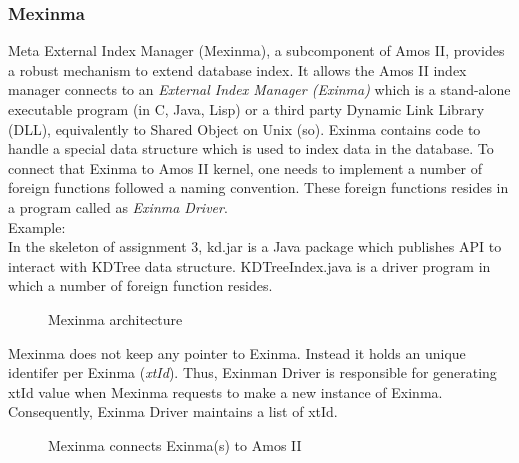 \documentclass[12pt]{article}
\begin{document}
\subsubsection{Mexinma}
Meta External Index Manager (Mexinma), a subcomponent of Amos II, provides a robust mechanism to extend database index. It allows the Amos II index manager connects to an \emph{External Index Manager (Exinma)} which is a stand-alone executable program (in C, Java, Lisp) or a third party Dynamic Link Library (DLL), equivalently to Shared Object on Unix (so). Exinma contains code to handle a special data structure which is used to index data in the database. To connect that Exinma to Amos II kernel, one needs to implement a number of foreign functions followed a naming convention. These foreign functions resides in a program called as \emph{Exinma Driver}.\\
 Example:\\
 In the skeleton of assignment 3, kd.jar is a Java package which publishes API to interact with KDTree data structure. KDTreeIndex.java is a driver program in which a number of foreign function resides.

\begin{figure}[H]
  \centering
  \caption{Mexinma architecture}\label{Mexinma-architecture}
\end{figure}

Mexinma does not keep any pointer to Exinma. Instead it holds an unique identifer per Exinma (\emph{xtId}). Thus, Exinman Driver is responsible for generating xtId value when Mexinma requests to make a new instance of Exinma. Consequently, Exinma Driver maintains a list of xtId.

\begin{figure}[H]
  \caption{Mexinma connects Exinma(s) to Amos II}\label{Mexinma-connects-exinma}
\end{figure}
\end{document}
